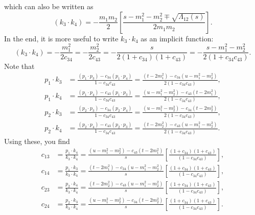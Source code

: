 which can also be written as
\begin{equation}
	\left( k_{3} \cdot k_{4} \right) = - \frac{m_{1} m_{2}}{2} \left[ \frac{s - m_{1}^{2} - m_{2}^{2} \mp \sqrt{\Lambda_{12}(s)}}{2m_{1} m_{2}} \right].
\end{equation}
In the end, it is more useful to write $k_{3} \cdot k_{4}$ as an implicit function:
\begin{equation}
	\left( k_{3} \cdot k_{4} \right) = - \frac{m_{1}^{2}}{2 c_{34}} = - \frac{m_{2}^{2}}{2 c_{43}} = - \frac{s}{2 \left(1 + c_{34} \right) \left(1 + c_{43} \right) } = -\frac{s - m_{1}^{2} - m_{2}^{2}}{2 \left(1 + c_{34} c_{43} \right)}.
\end{equation}
Note that
\begin{align}
	p_{1} \cdot k_{3} &= \frac{ \left( p_{1} \cdot p_{3} \right) - c_{34} \left( p_{1} \cdot p_{4} \right) }{1 - c_{34} c_{43}} = \frac{ \left( t - 2m_{1}^{2} \right) - c_{34} \left( u - m_{1}^{2} - m_{2}^{2} \right) }{2 \left( 1 - c_{34} c_{43} \right)}, \\
	p_{1} \cdot k_{4} &= \frac{ \left( p_{1} \cdot p_{4} \right) - c_{43} \left( p_{1} \cdot p_{3} \right) }{1 - c_{34} c_{43}} = \frac{ \left( u - m_{1}^{2} - m_{2}^{2} \right) - c_{43} \left( t - 2m_{1}^{2} \right) }{2 \left( 1 - c_{34} c_{43} \right)}, \\
	p_{2} \cdot k_{3} &= \frac{ \left( p_{2} \cdot p_{3} \right) - c_{34} \left( p_{2} \cdot p_{4} \right) }{1 - c_{34} c_{43}} = \frac{ \left( u - m_{1}^{2} - m_{2}^{2} \right) - c_{34} \left( t - 2m_{2}^{2} \right) }{2 \left( 1 - c_{34} c_{43} \right)}, \\
	p_{2} \cdot k_{4} &= \frac{ \left( p_{2} \cdot p_{4} \right) - c_{43} \left( p_{2} \cdot p_{3} \right) }{1 - c_{34} c_{43}} = \frac{ \left( t - 2m_{2}^{2} \right) - c_{43} \left( u - m_{1}^{2} - m_{2}^{2} \right) }{2 \left( 1 - c_{34} c_{43} \right)}.
\end{align}
Using these, you find
\begin{align}
	c_{13} &= \frac{p_{1} \cdot k_{4}}{k_{3} \cdot k_{4}} = \frac{ \left( u - m_{1}^{2} - m_{2}^{2} \right) - c_{43} \left( t - 2m_{1}^{2} \right) }{s} \left[ \frac{\left(1 + c_{34} \right) \left(1 + c_{43} \right)}{\left(1 - c_{34} c_{43} \right)} \right], \\
	c_{14} &= \frac{p_{1} \cdot k_{3}}{k_{3} \cdot k_{4}} = \frac{ \left( t - 2m_{1}^{2} \right) - c_{34} \left( u - m_{1}^{2} - m_{2}^{2} \right) }{s} \left[ \frac{\left(1 + c_{34} \right) \left(1 + c_{43} \right)}{\left(1 - c_{34} c_{43} \right)} \right], \\
	c_{23} &= \frac{p_{2} \cdot k_{4}}{k_{3} \cdot k_{4}} = \frac{ \left( t - 2m_{2}^{2} \right) - c_{43} \left( u - m_{1}^{2} - m_{2}^{2} \right) }{s} \left[ \frac{\left(1 + c_{34} \right) \left(1 + c_{43} \right)}{\left(1 - c_{34} c_{43} \right)} \right], \\
	c_{24} &= \frac{p_{2} \cdot k_{3}}{k_{3} \cdot k_{4}} = \frac{ \left( u - m_{1}^{2} - m_{2}^{2} \right) - c_{34} \left( t - 2m_{2}^{2} \right) }{s} \left[ \frac{\left(1 + c_{34} \right) \left(1 + c_{43} \right)}{\left(1 - c_{34} c_{43} \right)} \right].
\end{align}
